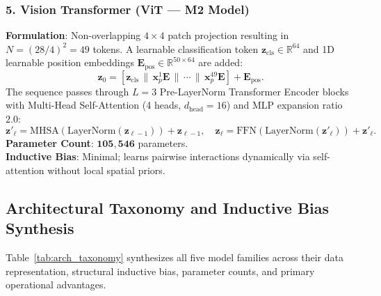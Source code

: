 \documentclass[11pt, a4paper]{article}
\begin{document}
\subsubsection{5. Vision Transformer (ViT --- M2 Model)}
\textbf{Formulation}: Non-overlapping $4 \times 4$ patch projection resulting in $N = (28/4)^2 = 49$ tokens. A learnable classification token $\mathbf{z}_{\text{cls}} \in \mathbb{R}^{64}$ and 1D learnable position embeddings $\mathbf{E}_{\text{pos}} \in \mathbb{R}^{50 \times 64}$ are added:
\begin{equation}
  \mathbf{z}_0 = [\mathbf{z}_{\text{cls}} \,\|\, \mathbf{x}_p^1\mathbf{E} \,\|\, \cdots \,\|\, \mathbf{x}_p^{49}\mathbf{E}] + \mathbf{E}_{\text{pos}}.
\end{equation}
The sequence passes through $L=3$ Pre-LayerNorm Transformer Encoder blocks with Multi-Head Self-Attention (4 heads, $d_{\text{head}}=16$) and MLP expansion ratio $2.0$:
\begin{equation}
  \mathbf{z}'_\ell = \text{MHSA}(\text{LayerNorm}(\mathbf{z}_{\ell-1})) + \mathbf{z}_{\ell-1}, \quad
  \mathbf{z}_\ell = \text{FFN}(\text{LayerNorm}(\mathbf{z}'_\ell)) + \mathbf{z}'_\ell.
\end{equation}
\textbf{Parameter Count}: $\mathbf{105{,}546}$ parameters.\\
\textbf{Inductive Bias}: Minimal; learns pairwise interactions dynamically via self-attention without local spatial priors.

\subsection{Architectural Taxonomy and Inductive Bias Synthesis}
Table~\ref{tab:arch_taxonomy} synthesizes all five model families across their data representation, structural inductive bias, parameter counts, and primary operational advantages.
\end{document}
